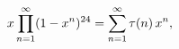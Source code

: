 \[x\prod_{n=1}^{\infty}(1-x^{n})^{24}=\sum_{n=1}^{\infty}\mathop{\tau\/}%
\nolimits\!\left(n\right)x^{n},\]